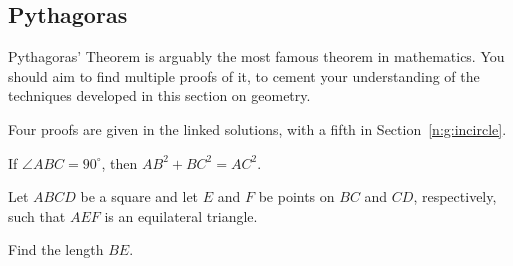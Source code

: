 \subsection{Pythagoras}
Pythagoras' Theorem is arguably the most famous theorem in mathematics. You
should aim to find multiple proofs of it, to cement your understanding of the
techniques developed in this section on geometry.

Four proofs are given in the linked solutions, with a fifth in
Section~\ref{n:g:incircle}.
\begin{result}{\label{r:b:g:py:1}}
    If $\angle ABC=90^\circ$, then $AB^2+BC^2=AC^2$.
\end{result}
\begin{problem}{\label{p:b:g:py:1}}
  Let $ABCD$ be a square and let $E$ and $F$ be points on $BC$ and $CD$,
  respectively, such that $AEF$ is an equilateral triangle.

  Find the length $BE$.
\end{problem}
